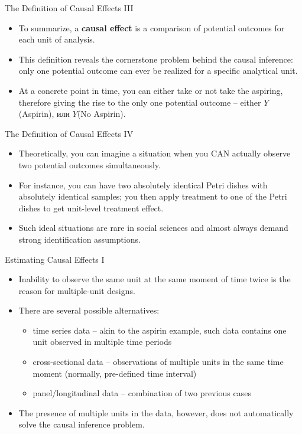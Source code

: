 \documentclass{beamer}
\begin{document}
\begin{frame}{The Definition of Causal Effects III}
\begin{itemize}
	\setlength\itemsep{1em}
	\item To summarize, a \textbf{causal effect} is a comparison of potential outcomes for each unit of analysis. 
	\item This definition reveals the cornerstone problem behind the causal inference: only one potential outcome can ever be realized for a specific analytical unit. 
	\item At a concrete point in time, you can either take or not take the aspiring, therefore giving the rise to the only one potential outcome -- either $Y$(Aspirin), или $Y$(No Aspirin).
\end{itemize}
\end{frame}
\begin{frame}{The Definition of Causal Effects IV}
\begin{itemize}
	\setlength\itemsep{1em}
	\item Theoretically, you can imagine a situation when you CAN actually observe two potential outcomes simultaneously. 
	\item For instance, you can have two absolutely identical Petri dishes with absolutely identical samples; you then apply treatment to one of the Petri dishes to get unit-level treatment effect. 
	\item Such ideal situations are rare in social sciences and almost always demand strong identification assumptions. 
\end{itemize}
\end{frame}
\begin{frame}{Estimating Causal Effects I}
\begin{itemize}
	\setlength\itemsep{1em}
	\item Inability to observe the same unit at the same moment of time twice is the reason for multiple-unit designs. 
	\item There are several possible alternatives: 
	\begin{itemize}
		\item time series data -- akin to the aspirin example, such data contains one unit observed in multiple time periods
		\item cross-sectional data -- observations of multiple units in the same time moment (normally, pre-defined time interval) 
		\item panel/longitudinal data -- combination of two previous cases
	\end{itemize}
	\item The presence of multiple units in the data, however, does not automatically solve the causal inference problem. 
\end{itemize}
\end{frame}
\end{document}
